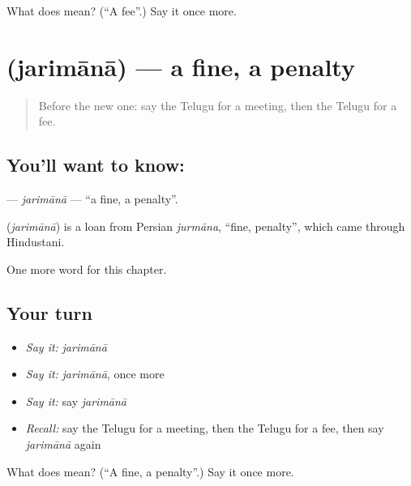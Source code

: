 \begin{tcolorbox}[breakable,colback=teal!4,colframe=teal!35!black,title={Before you move on}]
What does  mean? (\textquotedblleft{}A fee\textquotedblright{}.) Say it once more.
\end{tcolorbox}
\section[\texorpdfstring{\te{జరిమానా} (jarimānā)}{జరిమానా (jarimānā)}]{ (jarimānā) — a fine, a penalty}

\label{lesson:TE-C196-jarimana}



\begin{quote}
Before the new one: say the Telugu for a meeting, then the Telugu for a fee.
\end{quote}

\subsection*{You'll want to know: }
\textbf{} — \emph{jarimānā} — \textquotedblleft{}a fine, a penalty\textquotedblright{}.

\begin{cousinweb}
\textbf{} (\emph{jarimānā}) is a loan from Persian \emph{jurmāna}, \textquotedblleft{}fine, penalty\textquotedblright{}, which came through Hindustani.
\end{cousinweb}

\begin{grammarlens}[title={What you've built}]
One more word for this chapter.
\end{grammarlens}

\subsection*{Your turn}
\begin{itemize}
\raggedright
  \item \emph{Say it:} \emph{jarimānā}
  \item \emph{Say it:} \emph{jarimānā}, once more
  \item \emph{Say it:} say \emph{jarimānā}
  \item \emph{Recall:} say the Telugu for a meeting, then the Telugu for a fee, then say \emph{jarimānā} again
\end{itemize}

\begin{tcolorbox}[breakable,colback=teal!4,colframe=teal!35!black,title={Before you move on}]
What does  mean? (\textquotedblleft{}A fine, a penalty\textquotedblright{}.) Say it once more.
\end{tcolorbox}
